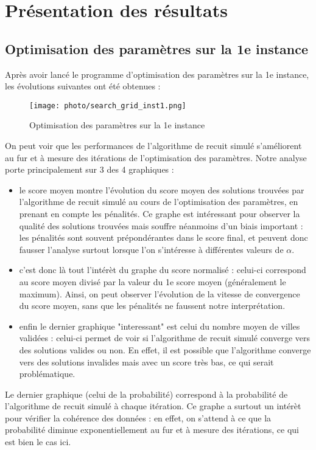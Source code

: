 \documentclass[a4paper, 12pt]{article}
\begin{document}
\section{Présentation des résultats}
\subsection{Optimisation des paramètres sur la 1e instance}
Après avoir lancé le programme d'optimisation des paramètres sur la 1e instance, les évolutions suivantes ont été obtenues :
\begin{figure}[!h]
    \centering
    \texttt{[image: photo/search\_grid\_inst1.png]}
    \caption{Optimisation des paramètres sur la 1e instance}
    \label{fig:parametres_1}
\end{figure}

On peut voir que les performances de l'algorithme de recuit simulé s'améliorent au fur et à mesure des itérations de l'optimisation des paramètres.
Notre analyse porte principalement sur 3 des 4 graphiques :
\begin{itemize}
    \item le score moyen montre l'évolution du score moyen des solutions trouvées par l'algorithme de recuit simulé au cours de l'optimisation des paramètres, en prenant en compte les pénalités.
    Ce graphe est intéressant pour observer la qualité des solutions trouvées mais souffre néanmoins d'un biais important : les pénalités sont souvent prépondérantes dans le score final, et peuvent donc fausser l'analyse surtout lorsque l'on s'intéresse à différentes valeurs de $\alpha$.
    \item c'est donc là tout l'intérèt du graphe du score normalisé : celui-ci correspond au score moyen divisé par la valeur du 1e score moyen (généralement le maximum). Ainsi, on peut observer l'évolution de la vitesse de convergence du score moyen, sans que les pénalités ne faussent notre interprétation.
    \item enfin le dernier graphique "interessant" est celui du nombre moyen de villes validées : celui-ci permet de voir si l'algorithme de recuit simulé converge vers des solutions valides ou non. En effet, il est possible que l'algorithme converge vers des solutions invalides mais avec un score très bas, ce qui serait problématique.
\end{itemize}

Le dernier graphique (celui de la probabilité) correspond à la probabilité de l'algorithme de recuit simulé à chaque itération. Ce graphe a surtout un intérèt pour vérifier la cohérence des données : en effet, on s'attend à ce que la probabilité diminue exponentiellement au fur et à mesure des itérations, ce qui est bien le cas ici.
\end{document}
